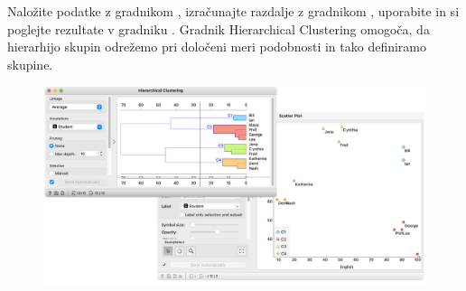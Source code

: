 Naložite podatke z gradnikom , izračunajte razdalje z gradnikom , uporabite  in si poglejte rezultate v gradniku . Gradnik Hierarchical Clustering omogoča, da hierarhijo skupin odrežemo pri določeni meri podobnosti in tako definiramo skupine.

\begin{figure}[h]
    \includegraphics[width=\linewidth]{hc-scatter-plot.png}%
    \caption{ }
    \label{fig:010-hc-scatter-plot}
\end{figure}